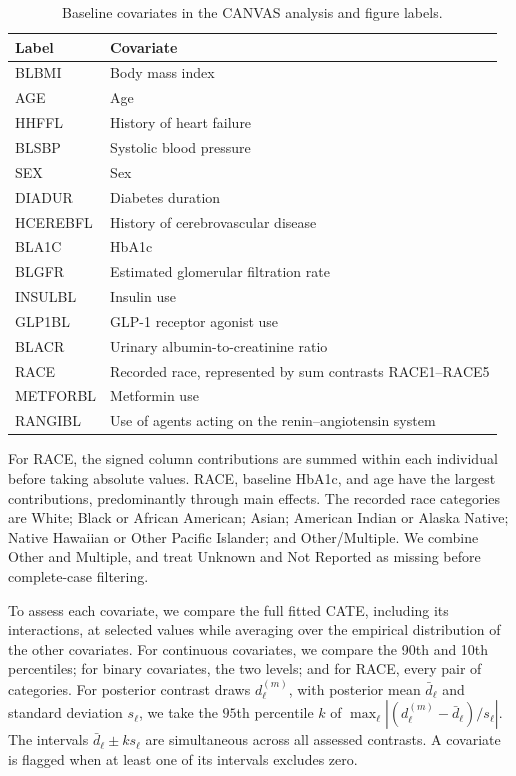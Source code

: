 \documentclass[12pt]{article}
\begin{document}
\begin{table}[htbp]
\centering\small
\caption{Baseline covariates in the CANVAS analysis and figure labels.}
\label{tab:canvas_covariates}
\begin{tabular}{lp{}}
\toprule
Label & Covariate\\
\midrule
BLBMI & Body mass index\\
AGE & Age\\
HHFFL & History of heart failure\\
BLSBP & Systolic blood pressure\\
SEX & Sex\\
DIADUR & Diabetes duration\\
HCEREBFL & History of cerebrovascular disease\\
BLA1C & HbA1c\\
BLGFR & Estimated glomerular filtration rate\\
INSULBL & Insulin use\\
GLP1BL & GLP-1 receptor agonist use\\
BLACR & Urinary albumin-to-creatinine ratio\\
RACE & Recorded race, represented by sum contrasts RACE1--RACE5\\
METFORBL & Metformin use\\
RANGIBL & Use of agents acting on the renin--angiotensin system\\
\bottomrule
\end{tabular}
\end{table}

For RACE, the signed column contributions are summed within each individual before taking absolute values. RACE, baseline HbA1c, and age have the largest contributions, predominantly through main effects. The recorded race categories are White; Black or African American; Asian; American Indian or Alaska Native; Native Hawaiian or Other Pacific Islander; and Other/Multiple. We combine Other and Multiple, and treat Unknown and Not Reported as missing before complete-case filtering.

To assess each covariate, we compare the full fitted CATE, including its interactions, at selected values while averaging over the empirical distribution of the other covariates. For continuous covariates, we compare the 90th and 10th percentiles; for binary covariates, the two levels; and for RACE, every pair of categories. For posterior contrast draws $d_\ell^{(m)}$, with posterior mean $\bar d_\ell$ and standard deviation $s_\ell$, we take the $95$th percentile $k$ of $\max_\ell |(d_\ell^{(m)}-\bar d_\ell)/s_\ell|$. The intervals $\bar d_\ell\pm k s_\ell$ are simultaneous across all assessed contrasts. A covariate is flagged when at least one of its intervals excludes zero.
\end{document}
